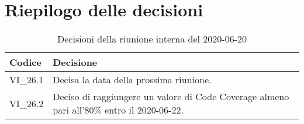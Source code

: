 \section{Riepilogo delle decisioni}
\begin{longtable}{ 
	 >{\centering}p{} >{}p{} }
	
	\caption{Decisioni della riunione interna del 2020-06-20}\\	
	
	\textbf{\color{white}Codice} & 
	\textbf{\color{white}Decisione} 
	\tabularnewline  
	\endhead
	
	VI\_26.1 & Decisa la data della prossima riunione. \\
	VI\_26.2 & Deciso di raggiungere un valore di Code Coverage almeno pari all'80\% entro il 2020-06-22. \\
\end{longtable}
